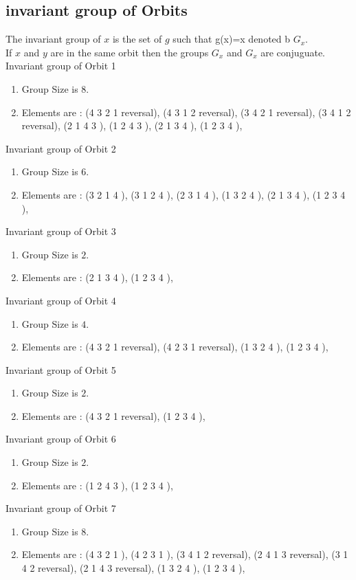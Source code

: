 \documentclass[12pt]{article}
\begin{document}
\subsection{invariant group of Orbits}
\noindent The invariant group of $x$ is the set of $g$ such that g(x)=x denoted b $G_x$.\\
If $x$ and $y$ are in the same orbit then the groups $G_x$ and  $G_x$ are conjuguate.\\
Invariant group of Orbit 1
\begin{enumerate}
\item Group Size is $8$.
\item Elements are : (4 3 2 1   reversal), (4 3 1 2   reversal), (3 4 2 1   reversal), (3 4 1 2   reversal), (2 1 4 3  ), (1 2 4 3  ), (2 1 3 4  ), (1 2 3 4  ), 
\end{enumerate}
Invariant group of Orbit 2
\begin{enumerate}
\item Group Size is $6$.
\item Elements are : (3 2 1 4  ), (3 1 2 4  ), (2 3 1 4  ), (1 3 2 4  ), (2 1 3 4  ), (1 2 3 4  ), 
\end{enumerate}
Invariant group of Orbit 3
\begin{enumerate}
\item Group Size is $2$.
\item Elements are : (2 1 3 4  ), (1 2 3 4  ), 
\end{enumerate}
Invariant group of Orbit 4
\begin{enumerate}
\item Group Size is $4$.
\item Elements are : (4 3 2 1   reversal), (4 2 3 1   reversal), (1 3 2 4  ), (1 2 3 4  ), 
\end{enumerate}
Invariant group of Orbit 5
\begin{enumerate}
\item Group Size is $2$.
\item Elements are : (4 3 2 1   reversal), (1 2 3 4  ), 
\end{enumerate}
Invariant group of Orbit 6
\begin{enumerate}
\item Group Size is $2$.
\item Elements are : (1 2 4 3  ), (1 2 3 4  ), 
\end{enumerate}
Invariant group of Orbit 7
\begin{enumerate}
\item Group Size is $8$.
\item Elements are : (4 3 2 1  ), (4 2 3 1  ), (3 4 1 2   reversal), (2 4 1 3   reversal), (3 1 4 2   reversal), (2 1 4 3   reversal), (1 3 2 4  ), (1 2 3 4  ), 
\end{enumerate}
\end{document}
